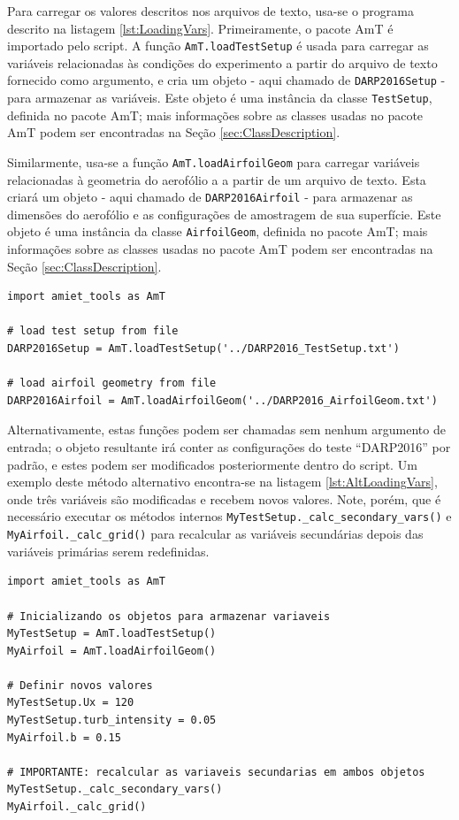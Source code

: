 \documentclass[a4paper, 11pt, twoside]{article}
\begin{document}
Para carregar os valores descritos nos arquivos de texto, usa-se o programa descrito na listagem \ref{lst:LoadingVars}. Primeiramente, o pacote AmT é importado pelo script. A função \verb|AmT.loadTestSetup| é usada para carregar as variáveis relacionadas às condições do experimento a partir do arquivo de texto fornecido como argumento, e cria um objeto - aqui chamado de \verb|DARP2016Setup| - para armazenar as variáveis. Este objeto é uma instância da classe \verb|TestSetup|, definida no pacote AmT; mais informações sobre as classes usadas no pacote AmT podem ser encontradas na Seção \ref{sec:ClassDescription}.

Similarmente, usa-se a função \verb|AmT.loadAirfoilGeom| para carregar variáveis relacionadas à geometria do aerofólio a a partir de um arquivo de texto. Esta criará um objeto - aqui chamado de \verb|DARP2016Airfoil| - para armazenar as dimensões do aerofólio e as configurações de amostragem de sua superfície. Este objeto é uma instância da classe \verb|AirfoilGeom|, definida no pacote AmT; mais informações sobre as classes usadas no pacote AmT podem ser encontradas na Seção \ref{sec:ClassDescription}.

\begin{lstlisting}[caption={Importando pacotes e carregando variáveis},label={lst:LoadingVars}]
import amiet_tools as AmT

# load test setup from file
DARP2016Setup = AmT.loadTestSetup('../DARP2016_TestSetup.txt')

# load airfoil geometry from file
DARP2016Airfoil = AmT.loadAirfoilGeom('../DARP2016_AirfoilGeom.txt')
\end{lstlisting}

Alternativamente, estas funções podem ser chamadas sem nenhum argumento de entrada; o objeto resultante irá conter as configurações do teste ``DARP2016'' por padrão, e estes podem ser modificados posteriormente dentro do script. Um exemplo deste método alternativo encontra-se na listagem \ref{lst:AltLoadingVars}, onde três variáveis são modificadas e recebem novos valores. Note, porém, que é necessário executar os métodos internos \verb|MyTestSetup._calc_secondary_vars()| e \verb|MyAirfoil._calc_grid()| para recalcular as variáveis secundárias depois das variáveis primárias serem redefinidas.

\begin{lstlisting}[caption={Método alternativo para carregar variáveis},label={lst:AltLoadingVars}]
import amiet_tools as AmT

# Inicializando os objetos para armazenar variaveis
MyTestSetup = AmT.loadTestSetup()
MyAirfoil = AmT.loadAirfoilGeom()

# Definir novos valores
MyTestSetup.Ux = 120
MyTestSetup.turb_intensity = 0.05
MyAirfoil.b = 0.15

# IMPORTANTE: recalcular as variaveis secundarias em ambos objetos
MyTestSetup._calc_secondary_vars()
MyAirfoil._calc_grid()
\end{lstlisting}
\end{document}
